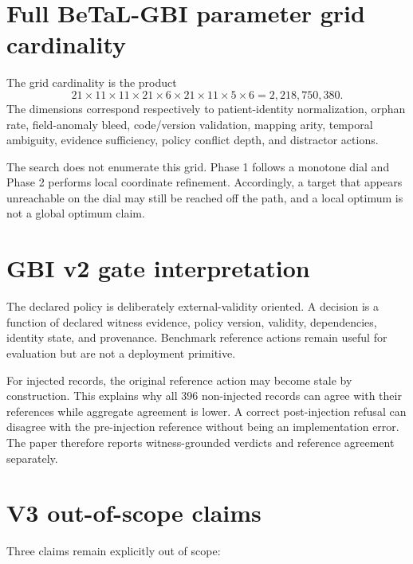 \documentclass[11pt]{article}
\begin{document}
\section{Full BeTaL-GBI parameter grid cardinality}

The grid cardinality is the product
\[
21\times 11\times 11\times 21\times 6\times 21\times 11\times 5\times 6
=2,218,750,380.
\]
The dimensions correspond respectively to patient-identity normalization, orphan rate, field-anomaly bleed, code/version validation, mapping arity, temporal ambiguity, evidence sufficiency, policy conflict depth, and distractor actions.

The search does not enumerate this grid. Phase 1 follows a monotone dial and Phase 2 performs local coordinate refinement. Accordingly, a target that appears unreachable on the dial may still be reached off the path, and a local optimum is not a global optimum claim.

\section{GBI v2 gate interpretation}

The declared policy is deliberately external-validity oriented. A decision is a function of declared witness evidence, policy version, validity, dependencies, identity state, and provenance. Benchmark reference actions remain useful for evaluation but are not a deployment primitive.

For injected records, the original reference action may become stale by construction. This explains why all 396 non-injected records can agree with their references while aggregate agreement is lower. A correct post-injection refusal can disagree with the pre-injection reference without being an implementation error. The paper therefore reports witness-grounded verdicts and reference agreement separately.
\section{V3 out-of-scope claims}

Three claims remain explicitly out of scope:
\end{document}
